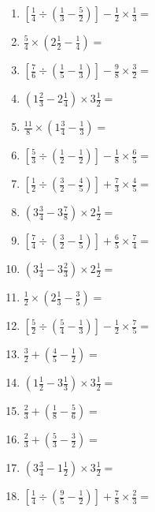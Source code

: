 \documentclass[12pt]{article}
\begin{document}
\begin{enumerate}[ itemsep=1.5cm]
	\item $\displaystyle \left[ \frac{1}{4} \div \left( \frac{1}{3} - \frac{5}{2} \right) \right] - \frac{1}{2} \times \frac{1}{3} =$
	\item $\displaystyle \frac{5}{4} \times \left( 2 \frac{1}{2} - \frac{1}{4} \right) =$
	\item $\displaystyle \left[ \frac{7}{6} \div \left( \frac{1}{5} - \frac{1}{3} \right) \right] - \frac{9}{8} \times \frac{3}{2} =$
	\item $\displaystyle \left( 1 \frac{2}{3} - 2 \frac{1}{4} \right) \times 3 \frac{1}{2} =$
	\item $\displaystyle \frac{11}{8} \times \left( 1 \frac{3}{4} - \frac{1}{3} \right) =$
	\item $\displaystyle \left[ \frac{5}{3} \div \left( \frac{1}{2} - \frac{1}{2} \right) \right] - \frac{1}{8} \times \frac{6}{5} =$
	\item $\displaystyle \left[ \frac{1}{2} \div \left( \frac{3}{2} - \frac{4}{5} \right) \right] + \frac{7}{3} \times \frac{4}{5} =$
	\item $\displaystyle \left( 3 \frac{3}{4} - 3 \frac{7}{8} \right) \times 2 \frac{1}{2} =$
	\item $\displaystyle \left[ \frac{7}{4} \div \left( \frac{3}{2} - \frac{1}{5} \right) \right] + \frac{6}{5} \times \frac{7}{4} =$

	\item $\displaystyle \left( 3 \frac{1}{4} - 3 \frac{2}{3} \right) \times 2 \frac{1}{2} =$
	\item $\displaystyle \frac{1}{2} \times \left( 2 \frac{1}{3} - \frac{3}{5} \right) =$
	\item $\displaystyle \left[ \frac{5}{2} \div \left( \frac{5}{4} - \frac{1}{3} \right) \right] - \frac{1}{2} \times \frac{7}{5} =$
	\item $\displaystyle \frac{3}{2} + \left( \frac{4}{5} - \frac{1}{2} \right) =$
	\item $\displaystyle \left( 1 \frac{1}{2} - 3 \frac{1}{3} \right) \times 3 \frac{1}{2} =$
	\item $\displaystyle \frac{2}{3} + \left( \frac{1}{8} - \frac{5}{6} \right) =$
	\item $\displaystyle \frac{2}{3} + \left( \frac{5}{3} - \frac{3}{2} \right) =$
	\item $\displaystyle \left( 3 \frac{3}{4} - 1 \frac{1}{2} \right) \times 3 \frac{1}{2} =$
	\item $\displaystyle \left[ \frac{1}{4} \div \left( \frac{9}{5} - \frac{1}{2} \right) \right] + \frac{7}{8} \times \frac{2}{3} =$


\end{enumerate}
\end{document}
